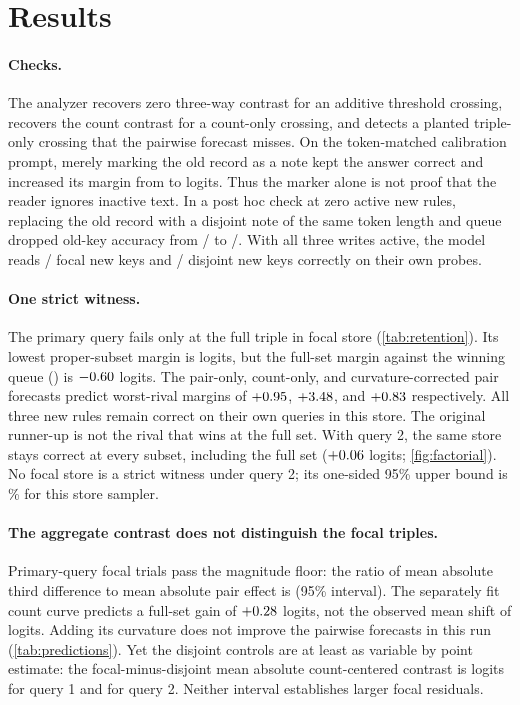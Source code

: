 \section{Results}
\label{sec:results}

\paragraph{Checks.}
The analyzer recovers zero three-way contrast for an additive threshold crossing,
recovers the count contrast for a count-only crossing, and detects a planted triple-only crossing that the pairwise forecast misses.
On the token-matched calibration prompt, merely marking the old record as a note kept the answer correct and increased its margin from \oldOn{} to \oldOff{} logits.
Thus the marker alone is not proof that the reader ignores inactive text.
In a post hoc check at zero active new rules, replacing the old record with a disjoint note of the same token length and queue dropped old-key accuracy from \holdoutN/\holdoutN{} to \unboundCorrect/\holdoutN{}.
With all three writes active, the model reads \primaryNew/\newTotal{} focal new keys and \controlNew/\newTotal{} disjoint new keys correctly on their own probes.

\paragraph{One strict witness.}
The primary query fails only at the full triple in \strictPrimary{} focal store (\cref{tab:retention}).
Its lowest proper-subset margin is \witnessProper{} logits, but the full-set margin against the winning queue (\witnessRival{}) is $-0.60{}$ logits.
The pair-only, count-only, and curvature-corrected pair forecasts predict worst-rival margins of
$+0.95{}$, $+3.48{}$, and $+0.83{}$ respectively.
All three new rules remain correct on their own queries in this store.
The original runner-up is not the rival that wins at the full set.
With query 2, the same store stays correct at every subset, including the full set ($+0.06{}$ logits; \cref{fig:factorial}).
No focal store is a strict witness under query 2; its one-sided 95\% upper bound is \noWitnessUpper\% for this store sampler.

\paragraph{The aggregate contrast does not distinguish the focal triples.}
Primary-query focal trials pass the magnitude floor: the ratio of mean absolute third difference to mean absolute pair effect is \primaryRatio{} (95\% interval).
The separately fit count curve predicts a full-set gain of $+0.28{}$ logits, not the observed mean shift of \primaryFullChange{} logits.
Adding its curvature does not improve the pairwise forecasts in this run (\cref{tab:predictions}).
Yet the disjoint controls are at least as variable by point estimate: the focal-minus-disjoint mean absolute count-centered contrast is \primaryResidualGap{} logits for query 1 and \secondaryResidualGap{} for query 2.
Neither interval establishes larger focal residuals.

